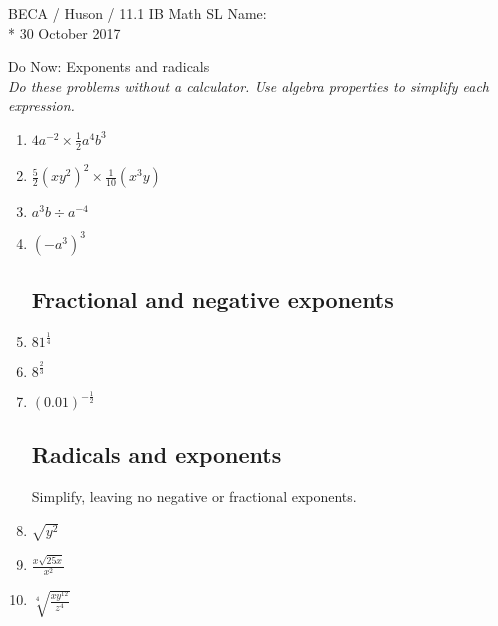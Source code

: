 \documentclass[]{book}
\begin{document}
\noindent BECA / Huson / 11.1 IB Math SL \hspace{2in} Name:\\*
30 October 2017
\begin{center}
{\Large Do Now: Exponents and radicals}\\
\textit{Do these problems without a calculator. Use algebra properties to simplify each expression.}
\end{center}


\begin{enumerate}

\subsection*{Exponent rules}

\item $\displaystyle 4a^{-2} \times \frac{1}{2}a^4 b^3$\\[10pt]
\item $\displaystyle \frac{5}{2} (x y^2)^2 \times \frac{1}{10}(x^3y)$\\[10pt]
\item $a^3 b \div a^{-4}$\\[10pt]
\item $(-a^3)^3$\\[10pt]

\subsection*{Fractional and negative exponents}

\item $\displaystyle  81^\frac{1}{4}$\\[10pt]
\item $\displaystyle  8^\frac{2}{3}$\\[10pt]
\item $\displaystyle  (0.01)^{-\frac{1}{2}}$\\[10pt]

\subsection*{Radicals and exponents}
Simplify, leaving no negative or fractional exponents.

\item $\sqrt{y^2}$\\[10pt]
\item $\displaystyle  \frac{x \sqrt{25x}}{x^{2}}$\\[10pt]
\item $\displaystyle  \sqrt[4]{\frac{x y^{12}}{z^{4}}}$\\[10pt]





\end{enumerate}
\end{document}
